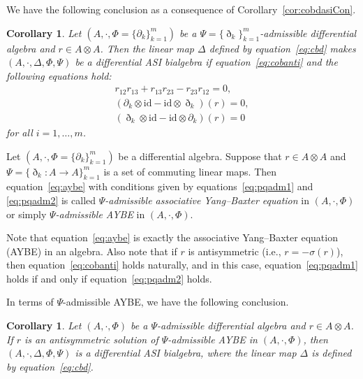 \documentclass[pdftex]{sigma}
\numberwithin{equation}{section}
\newtheorem{Corollary}[Theorem]{Corollary}
\newcommand{\id}{\mathrm{id}}
\begin{document}
We have the following conclusion as a consequence of Corollary~\ref{cor:cobdasiCon}.
\begin{Corollary}
 Let $(A, \cdot, \Phi = \{\partial_k\}_{k=1}^m)$ be a $\Psi = \{\eth_k\}_{k=1}^m$-admissible differential algebra and $r \in A \otimes A$.
 Then the linear map $\Delta$ defined by equation~\eqref{eq:cbd} makes $(A, \cdot, \Delta, \Phi, \Psi)$ be a differential ASI bialgebra
 if equation~\eqref{eq:cobanti} and the following equations hold:
 \begin{gather}
 r_{12} r_{13} + r_{13} r_{23} - r_{23} r_{12} = 0,\label{eq:aybe} \\
 (\partial_k \otimes \id - \id \otimes \eth_k)(r) = 0, \label{eq:pqadm1} \\
 (\eth_k \otimes \id - \id \otimes \partial_k)(r) = 0 \label{eq:pqadm2}
 \end{gather}
	for all $i=1, \dots, m$.
\end{Corollary}

\begin{Definition}
 Let $(A, \cdot, \Phi = \{\partial_k\}_{k=1}^m)$ be a differential algebra.
 Suppose that $r \in A \otimes A$ and $\Psi = \{\eth_k\colon A \to A\}_{k=1}^m$ is a set of commuting linear maps.
 Then equation~\eqref{eq:aybe} with conditions given by equations~\eqref{eq:pqadm1} and \eqref{eq:pqadm2} is called
 \textit{$\Psi$-admissible associative Yang--Baxter equation} in $(A, \cdot, \Phi)$ or simply \textit{$\Psi$-admissible AYBE} in $(A, \cdot, \Phi)$.
\end{Definition}

\begin{Remark}
 Note that equation~\eqref{eq:aybe} is exactly the associative Yang--Baxter equation (AYBE) in an algebra.
 Also note that if $r$ is antisymmetric (i.e., $r = - \sigma(r)$),
 then equation~\eqref{eq:cobanti} holds naturally, and in this case, equation~\eqref{eq:pqadm1} holds if and only if equation~\eqref{eq:pqadm2} holds.
\end{Remark}

In terms of $\Psi$-admissible AYBE, we have the following conclusion.
\begin{Corollary}\label{cor:admAYBEdasi}
 Let $(A, \cdot, \Phi)$ be a $\Psi$-admissible differential algebra and $r \in A \otimes A$.
 If $r$ is an antisymmetric solution of $\Psi$-admissible AYBE in $(A, \cdot, \Phi)$,
 then $(A, \cdot, \Delta, \Phi ,\Psi)$ is a differential ASI bialgebra,
 where the linear map $\Delta$ is defined by equation~\eqref{eq:cbd}.
\end{Corollary}
\end{document}
